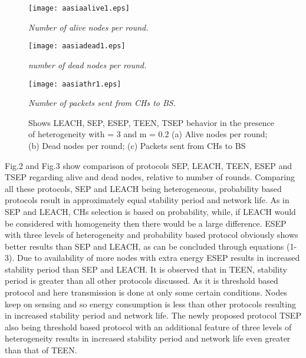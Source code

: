\documentclass[conference]{IEEEtran}
\begin{document}
\begin{figure}
\begin{center}
\texttt{[image: aasiaalive1.eps]}
\vspace{-0.5cm}
\caption{\small \sl Number of alive nodes per round.\label{fig:Stupendous}}
\end{center}
\end{figure}

\begin{figure}
\begin{center}
\texttt{[image: aasiadead1.eps]}
\vspace{-0.5cm}
\caption{\small \sl number of dead nodes per round.\label{fig:Stupendous}}
\end{center}
\end{figure}
\begin{figure}
\begin{center}
\texttt{[image: aasiathr1.eps]}
\caption{\small \sl Number of packets sent from CHs to BS.\label{fig:Stupendous}}
\end{center}
\end{figure}

\begin{figure}[htb]
  \centering
{}
\caption{Shows LEACH, SEP, ESEP, TEEN, TSEP behavior in the presence of heterogeneity with  = 3 and m = 0.2 (a) Alive nodes per round; (b) Dead nodes per round; (c) Packets sent from CHs to BS}
\end{figure}

Fig.2 and Fig.3 show comparison of protocols SEP, LEACH, TEEN, ESEP and TSEP regarding alive and dead nodes, relative to number of rounds. Comparing all these protocols, SEP and LEACH being heterogeneous, probability based protocols result in approximately equal stability period and network life. As in SEP and LEACH, CHs selection is based on probability, while, if LEACH would be considered with homogeneity then there would be a large difference. ESEP with three levels of heterogeneity and probability based protocol obviously shows better results than SEP and LEACH, as can be concluded through equations (1-3). Due to availability of more nodes with extra energy ESEP results in increased stability period than SEP and LEACH. It is observed that in TEEN, stability period is greater than all other protocols discussed. As it is threshold based protocol and here transmission is done at only some certain conditions. Nodes keep on sensing and so energy consumption is less than other protocols resulting in increased stability period and network life. The newly proposed protocol TSEP also being threshold based protocol with an additional feature of three levels of heterogeneity results in increased stability period and network life even greater than that of TEEN.
\end{document}
